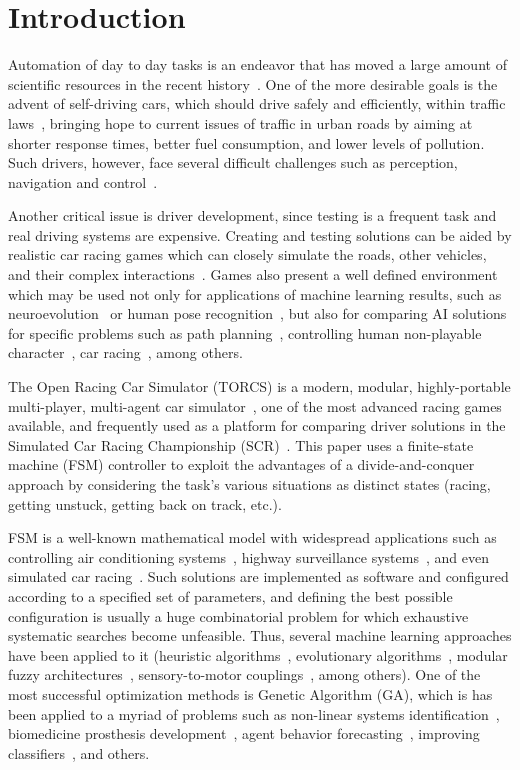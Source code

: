 \section{Introduction}\label{sec:1}

Automation of day to day tasks is an endeavor that has moved a large amount of scientific resources in the recent history~\cite{INDUS,APPLI}. One of the more desirable goals is the advent of self-driving cars, which should drive safely and efficiently, within traffic laws~\cite{SAFE,AUTOM}, bringing hope to current issues of traffic in urban roads by aiming at shorter response times, better fuel consumption, and lower levels of pollution. Such drivers, however, face several difficult challenges such as perception, navigation and control~\cite{6179503}.

Another critical issue is driver development, since testing is a frequent task and real driving systems are expensive. Creating and testing solutions can be aided by realistic car racing games which can closely simulate the roads, other vehicles, and their complex interactions~\cite{caldeira2013torcs}. Games also present a well defined environment which may be used not only for applications of machine learning results, such as neuroevolution~\cite{stanley_real-time_2005,5482132} or human pose recognition~\cite{Shotton:2011}, but also for comparing AI solutions for specific problems such as path planning~\cite{deFreitas:2012}, controlling human non-playable character~\cite{simon2008}, car racing~\cite{2009}, among others.

The Open Racing Car Simulator (TORCS) is a modern, modular, highly-portable multi-player, multi-agent car simulator~\cite{SIMUTORCS}, one of the most advanced racing games available, and frequently used as a platform for comparing driver solutions in the Simulated Car Racing Championship (SCR)~\cite{2009,Loiacono:2012:LEA:2212908.2212953}. This paper uses a finite-state machine (FSM) controller to exploit the advantages of a divide-and-conquer approach by considering the task's various situations as distinct states (racing, getting unstuck, getting back on track, etc.).

FSM is a well-known mathematical model with widespread applications such as controlling air conditioning systems~\cite{BERNARD}, highway surveillance systems~\cite{DOHYUN}, and even simulated car racing~\cite{DIEGO}. Such solutions are implemented as software and configured according to a specified set of parameters, and defining the best possible configuration is usually a huge combinatorial problem for which exhaustive systematic searches become unfeasible. Thus, several machine learning approaches have been applied to it (heuristic algorithms~\cite{MrRacer}, evolutionary algorithms~\cite{Nallaperuma:2014}, modular fuzzy architectures~\cite{AUTOPIA}, sensory-to-motor couplings~\cite{COBOSTAR}, among others). One of the most successful optimization methods is Genetic Algorithm (GA), which is has been applied to a myriad of problems such as non-linear systems identification~\cite{GACTRL}, biomedicine prosthesis development~\cite{GABIO}, agent behavior forecasting~\cite{GAECO}, improving classifiers~\cite{pedrycz_genetic_2005}, and others.

